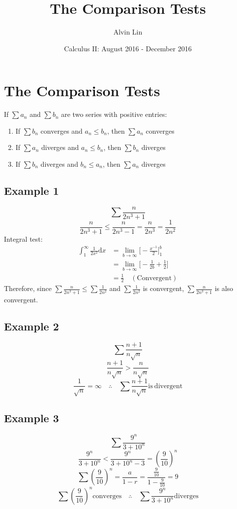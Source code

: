 \documentclass[letterpaper, 12pt]{article}
\title{The Comparison Tests}
\author{Alvin Lin}
\date{Calculus II: August 2016 - December 2016}
\newcommand*{\diff}{\mathrm{d}}
\begin{document}
\maketitle

\section*{The Comparison Tests}
If \( \sum{a_{n}} \) and \( \sum{b_{n}} \) are two series with positive entries:
\begin{enumerate}
  \item If \( \sum{b_{n}} \) converges and \( a_{n} \leq b_{n} \), then
    \( \sum{a_{n}} \) converges
  \item If \( \sum{a_{n}} \) diverges and \( a_{n} \leq b_{n} \), then
    \( \sum{b_{n}} \) diverges
  \item If \( \sum{b_{n}} \) diverges and \( b_{n} \leq a_{n} \), then
    \( \sum{a_{n}} \) diverges
\end{enumerate}

\subsection*{Example 1}
\[ \sum\frac{n}{2n^{3}+1} \]
\[ \frac{n}{2n^{3}+1} \leq \frac{n}{2n^{3}-1} = \frac{n}{2n^{3}} =
   \frac{1}{2n^{2}} \]
Integral test:
\begin{align*}
  \int_{1}^{\infty}\frac{1}{2x^{2}}\diff{x} &=
    \lim_{b\to\infty}\bigg[-\frac{x^{-1}}{2}\bigg]_{1}^{b} \\
  &= \lim_{b\to\infty}\bigg[-\frac{1}{2b}+\frac{1}{2}\bigg] \\
  &= \frac{1}{2} \quad \mathrm{(Convergent)}
\end{align*}
Therefore, since \( \sum\frac{n}{2n^{3}+1} \leq \sum\frac{1}{2n^{2}} \) and
\( \sum\frac{1}{2n^{2}} \) is convergent, \( \sum\frac{n}{2n^{3}+1} \) is
also convergent.

\subsection*{Example 2}
\[ \sum\frac{n+1}{n\sqrt{n}} \]
\[ \frac{n+1}{n\sqrt{n}} > \frac{n}{n\sqrt{n}} \]
\[ \frac{1}{\sqrt{n}} = \infty \quad \therefore \quad \sum\frac{n+1}{n\sqrt{n}}
   \mathrm{is\ divergent} \]

\subsection*{Example 3}
\[ \sum\frac{9^{n}}{3+10^{n}} \]
\[ \frac{9^{n}}{3+10^{n}} < \frac{9^{n}}{3+10^{n}-3} = (\frac{9}{10})^{n} \]
\[ \sum(\frac{9}{10})^{n} = \frac{a}{1-r} =
   \frac{\frac{9}{10}}{1-\frac{9}{10}} = 9 \]
\[ \sum(\frac{9}{10})^{n} \mathrm{converges} \quad \therefore \quad
   \sum\frac{9^{n}}{3+10^{n}} \mathrm{diverges} \]
\end{document}
